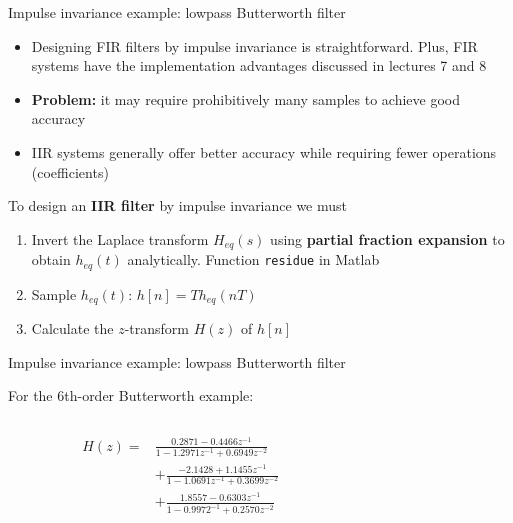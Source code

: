 \documentclass[10pt, handout]{beamer}
\begin{document}
%
\begin{frame}{Impulse invariance example: lowpass Butterworth filter}

\begin{itemize}
	\item Designing FIR filters by impulse invariance is straightforward. Plus, FIR systems have the implementation advantages discussed in lectures 7 and 8
	\item \textbf{Problem:} it may require prohibitively many samples to achieve good accuracy
	\item IIR systems generally offer better accuracy while requiring fewer operations (coefficients)
\end{itemize}

To design an \textbf{IIR filter} by impulse invariance we must

\begin{enumerate}
	\item Invert the Laplace transform $H_{eq}(s)$ using \textbf{partial fraction expansion} to obtain $h_{eq}(t)$ analytically. Function \texttt{residue} in Matlab	
	\item Sample $h_{eq}(t)$: $h[n] = Th_{eq}(nT)$
	\item Calculate the $z$-transform $H(z)$ of $h[n]$
\end{enumerate}
\end{frame}


%
\begin{frame}{Impulse invariance example: lowpass Butterworth filter}

For the 6th-order Butterworth example:

\begin{columns}
	\begin{column}{0.5\textwidth}
		\begin{align*}
		H(z) =& \frac{0.2871 -0.4466z^{-1}}{1 -1.2971z^{-1} + 0.6949z^{-2}} \\ &+\frac{-2.1428 +1.1455z^{-1}}{1 -1.0691z^{-1} + 0.3699z^{-2}}  \\
		&+\frac{1.8557 - 0.6303z^{-1}}{1 -0.9972^{-1} + 0.2570z^{-2}} 
		\end{align*}
	\end{column}
	
	\begin{column}{0.5\textwidth}
		\begin{center}
			\resizebox{\linewidth}{!}{}
		\end{center}
	\end{column}
\end{columns}
\end{frame}
\end{document}
